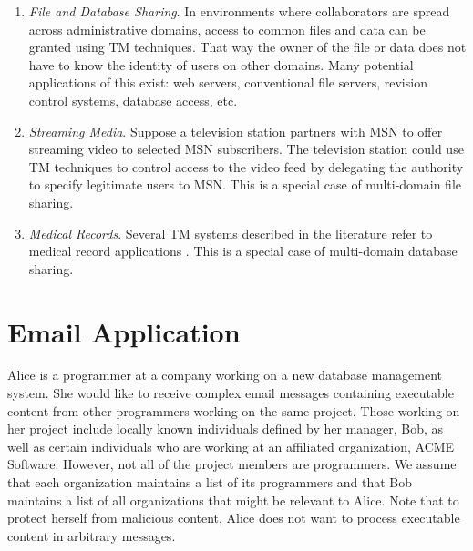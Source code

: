 \documentclass{article}
\begin{document}
\begin{enumerate}
\item \textit{File and Database Sharing}. In environments where
  collaborators are spread across administrative domains, access to common
  files and data can be granted using TM techniques. That way the owner of
  the file or data does not have to know the identity of users on other
  domains. Many potential applications of this exist: web servers,
  conventional file servers, revision control systems, database access,
  etc.

\item \textit{Streaming Media}. Suppose a television station partners with
  MSN to offer streaming video to selected MSN subscribers. The television
  station could use TM techniques to control access to the video feed by
  delegating the authority to specify legitimate users to MSN. This is a
  special case of multi-domain file sharing.

\item \textit{Medical Records}. Several TM systems described in the
  literature refer to medical record applications \cite{Bacon:MORBACSAS,
  Becker:CFTMAEHR}. This is a special case of multi-domain database
  sharing.

\end{enumerate}

\section{Email Application}

%
%

Alice is a programmer at a company working on a new database management
system. She would like to receive complex email messages containing
executable content from other programmers working on the same project.
Those working on her project include locally known individuals defined by
her manager, Bob, as well as certain individuals who are working at an
affiliated organization, ACME Software. However, not all of the project
members are programmers. We assume that each organization maintains a list
of its programmers and that Bob maintains a list of all organizations that
might be relevant to Alice. Note that to protect herself from malicious
content, Alice does not want to process executable content in arbitrary
messages.
\end{document}
